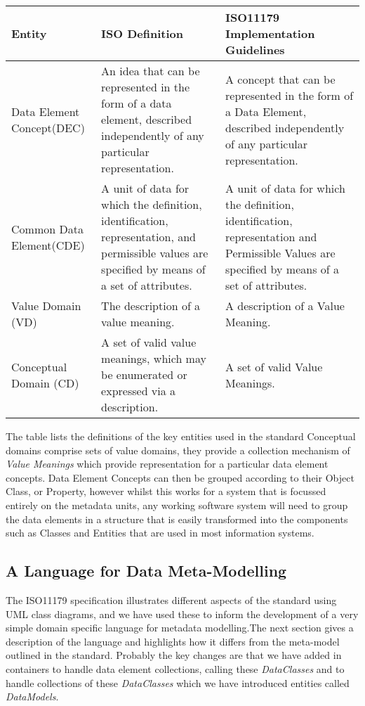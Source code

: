 \begin{table}[h]
	\begin{tabular}{ p{1.8cm} p{2.8cm}  p{3.0cm}  }  %
		\hline
		Entity & ISO Definition & ISO11179 Implementation Guidelines  \\ 
		\hline
		Data Element Concept(DEC) & An idea that can be represented in the form of a data element, described independently of any particular representation. & A concept that can be represented in the form of a Data Element, described independently of any particular representation.\\
		Common Data Element(CDE) & A unit of data for which the definition, identification, representation, and permissible values are specified by means of a set of attributes. & A unit of data for which the definition, identification, representation and Permissible Values are specified by means of a set of attributes. \\
		Value Domain (VD) & The description of a value meaning. & A description of a Value Meaning. \\
		Conceptual Domain (CD) & A set of valid value meanings, which may be enumerated or expressed via a description.& A set of valid Value Meanings.\\
		\hline
	\end{tabular}
\end{table}

The table lists the definitions of the key entities used in the standard
Conceptual domains comprise sets of value domains, they provide a collection mechanism of \emph{Value Meanings} which provide representation for a particular data element concepts. Data Element Concepts can then be grouped according to their Object Class, or Property, however whilst this works for a system that is focussed entirely on the metadata units, any working software system will need to group the data elements in a structure that is easily transformed into the components such as Classes and Entities that are used in most information systems.   



\subsection{A Language for Data Meta-Modelling }

The ISO11179 specification illustrates different aspects of the standard using UML class diagrams, and we have used these to inform the development of a very simple domain specific language for metadata modelling.The next section gives a description of the language and highlights how it differs from the meta-model outlined in the standard. Probably the key changes are that we have added in containers to handle data element collections, calling these \emph{DataClasses} and to handle collections of these \emph{DataClasses} which we have introduced entities called \emph{DataModels}.

